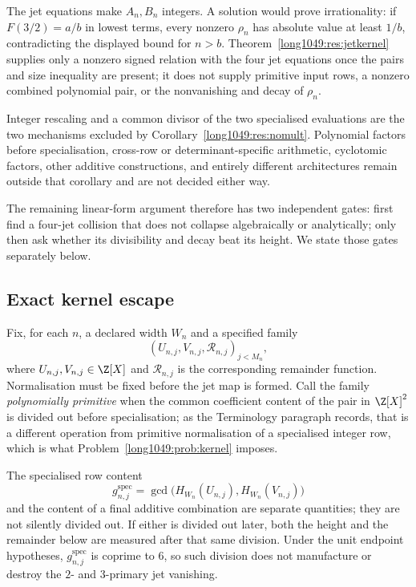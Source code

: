 \documentclass[11pt]{article}
\begin{document}
The jet equations make \(A_n,B_n\) integers.  A solution would prove
irrationality: if \(F(3/2)=a/b\) in lowest terms, every nonzero \(\rho_n\) has
absolute value at least \(1/b\), contradicting the displayed bound for
\(n>b\).  Theorem~\ref{long1049:res:jetkernel} supplies only a nonzero signed relation
with the four jet equations once the pairs and size inequality are present; it
does not supply primitive input rows, a nonzero combined polynomial pair, or
the nonvanishing and decay of \(\rho_n\).

Integer rescaling and a common divisor of the two specialised evaluations are
the two mechanisms excluded by Corollary~\ref{long1049:res:nomult}.  Polynomial factors
before specialisation, cross-row or determinant-specific arithmetic,
cyclotomic factors, other additive constructions, and entirely different
architectures remain outside that corollary and are not decided either way.

The remaining linear-form argument therefore has two
independent gates: first find a four-jet collision that does not collapse
algebraically or analytically; only then ask whether its divisibility and decay
beat its height.  We state those gates separately below.

\subsection{Exact kernel escape}

Fix, for each $n$, a declared width $W_n$ and a specified family
\[
 (U_{n,j},V_{n,j},\mathcal R_{n,j})_{j<M_n},
\]
where $U_{n,j},V_{n,j}\in\Z[X]$ and $\mathcal R_{n,j}$ is the corresponding
remainder function.  Normalisation must be fixed before the jet map is formed.
Call the family \emph{polynomially primitive} when the common coefficient
content of the pair in $\Z[X]^2$ is divided out before specialisation; as the
Terminology paragraph records, that is a different operation from primitive
normalisation of a specialised integer row, which is what
Problem~\ref{long1049:prob:kernel} imposes.

The specialised row content
\[
 g^{\mathrm{spec}}_{n,j}
 =\gcd\!\bigl(H_{W_n}(U_{n,j}),H_{W_n}(V_{n,j})\bigr)
\]
and the content of a final additive combination are separate quantities; they
are not silently divided out.  If either is divided out later, both the height
and the remainder below are measured after that same division.  Under the unit
endpoint hypotheses, $g^{\mathrm{spec}}_{n,j}$ is coprime to $6$, so such
division does not manufacture or destroy the $2$- and $3$-primary jet
vanishing.
\end{document}
